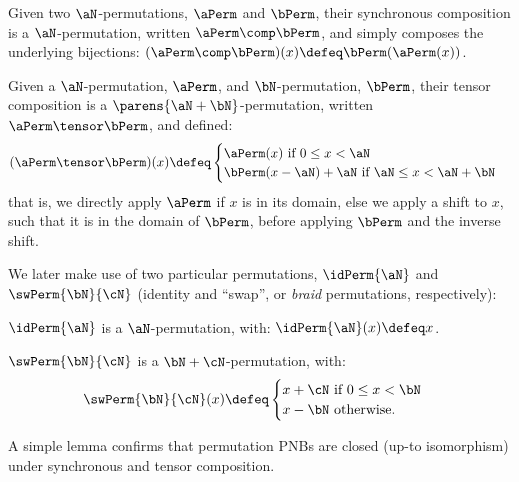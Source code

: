 \begin{definition}
    Given two $\aN$-permutations, $\aPerm$ and $\bPerm$, their synchronous
    composition is a $\aN$-permutation, written $\aPerm \comp \bPerm$, and
    simply composes the underlying bijections: $(\aPerm \comp \bPerm)(x) \defeq
    \bPerm(\aPerm(x))$.
\end{definition}

\begin{definition}
    \newcommand{\aVar}{x}
    Given a $\aN$-permutation, $\aPerm$, and $\bN$-permutation, $\bPerm$,
    their tensor composition is a $\parens{\aN + \bN}$-permutation, written $\aPerm
    \tensor \bPerm$, and defined:
    \[
    (\aPerm \tensor \bPerm)(\aVar)
    \defeq
    \begin{cases}
        \aPerm(\aVar) \text{ if } 0 \le \aVar < \aN\\
        \bPerm(\aVar - \aN) + \aN \text{ if } \aN \le \aVar < \aN + \bN
    \end{cases}
    \]
    that is, we directly apply $\aPerm$ if $\aVar$ is in its domain, else we
    apply a shift to $\aVar$, such that it is in the domain of $\bPerm$, before
    applying $\bPerm$ and the inverse shift.
\end{definition}

We later make use of two particular permutations, $\idPerm{\aN}$ and
$\swPerm{\bN}{\cN}$ (identity and ``swap'', or \emph{braid} permutations,
respectively):
\begin{example}
    $\idPerm{\aN}$ is a $\aN$-permutation, with: $\idPerm{\aN}(x) \defeq x$.
\end{example}
\begin{example}
    $\swPerm{\bN}{\cN}$ is a $\bN+\cN$-permutation, with:
    \[
    \swPerm{\bN}{\cN}(x) \defeq
    \begin{cases}
        x + \cN \text{ if } 0 \le x < \bN\\
        x - \bN \text{ otherwise.}
    \end{cases}
    \]
\end{example}

A simple lemma confirms that permutation PNBs are closed (up-to isomorphism) under synchronous and
tensor composition.

